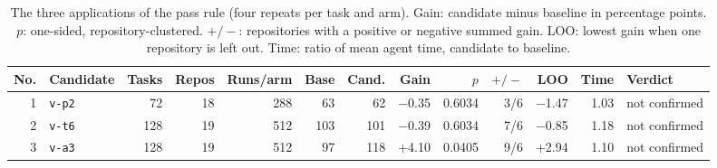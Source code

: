 \begin{table}[t]
\centering
\footnotesize\setlength{\tabcolsep}{3.6pt}
\caption{The three applications of the pass rule (four repeats per task and arm). Gain: candidate minus baseline in percentage points. $p$: one-sided, repository-clustered. $+/-$: repositories with a positive or negative summed gain. LOO: lowest gain when one repository is left out. Time: ratio of mean agent time, candidate to baseline.}
\label{tab:confirm}
\begin{tabular}{rlrrrrrrrrrrl}
\toprule
No. & Candidate & Tasks & Repos & Runs/arm & Base & Cand. & Gain & $p$ & $+/-$ & LOO & Time & Verdict \\
\midrule
1 & \texttt{v-p2} & 72 & 18 & 288 & 63 & 62 & \ensuremath{-}0.35 & 0.6034 & 3/6 & \ensuremath{-}1.47 & 1.03 & not confirmed \\
2 & \texttt{v-t6} & 128 & 19 & 512 & 103 & 101 & \ensuremath{-}0.39 & 0.6034 & 7/6 & \ensuremath{-}0.85 & 1.18 & not confirmed \\
3 & \texttt{v-a3} & 128 & 19 & 512 & 97 & 118 & +4.10 & 0.0405 & 9/6 & +2.94 & 1.10 & not confirmed \\
\bottomrule
\end{tabular}
\end{table}
